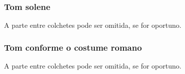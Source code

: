 \subsubsection{Tom solene}
\begin{rubrica}
  A parte entre colchetes pode ser omitida, se for oportuno.
\end{rubrica}

\AllowPageBreak

\subsubsection{Tom conforme o costume romano}
\begin{rubrica}
  A parte entre colchetes pode ser omitida, se for oportuno.
\end{rubrica}

\AllowPageBreak

\label{appendix:veni-creator-spiritus}
